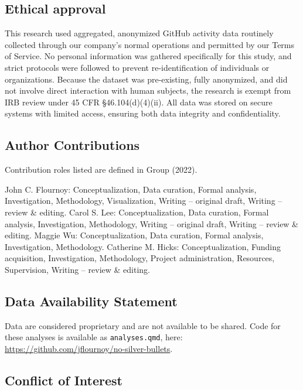 \documentclass[
]{article}
\begin{document}
\subsection{Ethical approval}\label{ethical-approval}

This research used aggregated, anonymized GitHub activity data routinely
collected through our company's normal operations and permitted by our
Terms of Service. No personal information was gathered specifically for
this study, and strict protocols were followed to prevent
re-identification of individuals or organizations. Because the dataset
was pre-existing, fully anonymized, and did not involve direct
interaction with human subjects, the research is exempt from IRB review
under 45 CFR \S 46.104(d)(4)(ii). All data was stored on secure systems
with limited access, ensuring both data integrity and confidentiality.

\subsection{Author Contributions}\label{author-contributions}

Contribution roles listed are defined in Group (2022).

John C. Flournoy: Conceptualization, Data curation, Formal analysis,
Investigation, Methodology, Visualization, Writing -- original draft,
Writing -- review \& editing. Carol S. Lee: Conceptualization, Data
curation, Formal analysis, Investigation, Methodology, Writing --
original draft, Writing -- review \& editing. Maggie Wu:
Conceptualization, Data curation, Formal analysis, Investigation,
Methodology. Catherine M. Hicks: Conceptualization, Funding acquisition,
Investigation, Methodology, Project administration, Resources,
Supervision, Writing -- review \& editing.

\subsection{Data Availability
Statement}\label{data-availability-statement}

Data are considered proprietary and are not available to be shared. Code
for these analyses is available as \texttt{analyses.qmd}, here:
\url{https://github.com/jflournoy/no-silver-bullets}.

\subsection{Conflict of Interest}\label{conflict-of-interest}
\end{document}
